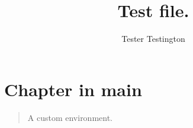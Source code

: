 \documentclass{book}
\title{Test file.}
\author{Tester Testington}
\begin{document}
\maketitle

\chapter{Chapter in main}


\begin{quote}
  A custom environment.
\end{quote}


\end{document}
